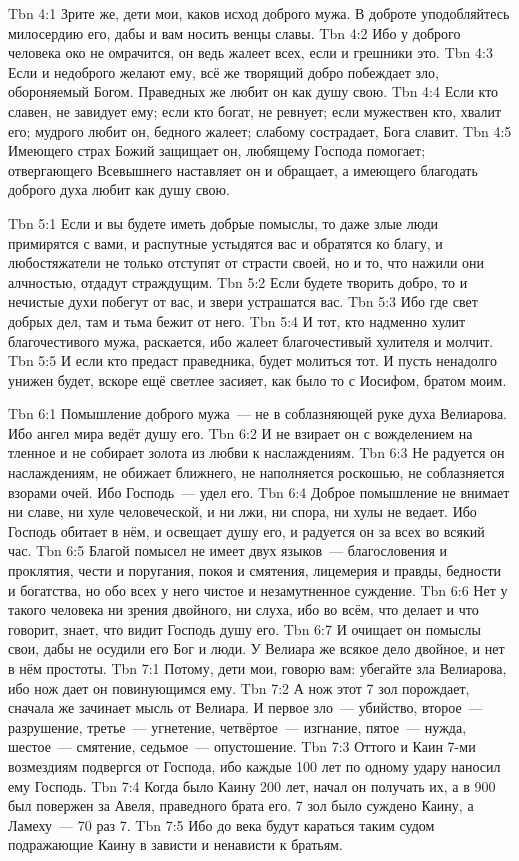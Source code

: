 \vs Tbn 4:1
Зрите же, дети мои, каков исход доброго мужа.
В доброте уподобляйтесь милосердию его, дабы и вам носить венцы славы.
\vs Tbn 4:2
Ибо у доброго человека око не омрачится, он ведь жалеет всех, если и
грешники это.
\vs Tbn 4:3
Если и недоброго желают ему, всё же творящий добро побеждает зло,
обороняемый Богом.
Праведных же любит он как душу свою.
\vs Tbn 4:4
Если кто славен, не завидует ему; если кто богат, не ревнует;
если мужествен кто, хвалит его; мудрого любит он, бедного жалеет;
слабому сострадает, Бога славит.
\vs Tbn 4:5
Имеющего страх Божий защищает он, любящему Господа помогает;
отвергающего Всевышнего наставляет он и обращает,
а имеющего благодать доброго духа любит как душу свою.

\vs Tbn 5:1
Если и вы будете иметь добрые помыслы,
то даже злые люди примирятся с вами,
и распутные устыдятся вас и обратятся ко благу,
и любостяжатели не только отступят от страсти своей,
но и то, что нажили они алчностью, отдадут страждущим.
\vs Tbn 5:2
Если будете творить добро, то и нечистые духи побегут от вас,
и звери устрашатся вас.
\vs Tbn 5:3
Ибо где свет добрых дел, там и тьма бежит от него.
\vs Tbn 5:4
И тот, кто надменно хулит благочестивого мужа, раскается,
ибо жалеет благочестивый хулителя и молчит.
\vs Tbn 5:5
И если кто предаст праведника, будет молиться тот.
И пусть ненадолго унижен будет, вскоре ещё светлее засияет,
как было то с Иосифом, братом моим.

\vs Tbn 6:1
Помышление доброго мужа~--- не в соблазняющей руке духа Велиарова.
Ибо ангел мира ведёт душу его.
\vs Tbn 6:2
И не взирает он с вожделением на тленное
и не собирает золота из любви к наслаждениям.
\vs Tbn 6:3
Не радуется он наслаждениям, не обижает ближнего,
не наполняется роскошью, не соблазняется взорами очей.
Ибо Господь~--- удел его.
\vs Tbn 6:4
Доброе помышление не внимает ни славе, ни хуле человеческой,
и ни лжи, ни спора, ни хулы не ведает.
Ибо Господь обитает в нём, и освещает душу его,
и радуется он за всех во всякий час.
\vs Tbn 6:5
Благой помысел не имеет двух языков~--- благословения и проклятия,
чести и поругания, покоя и смятения, лицемерия и правды,
бедности и богатства, но обо всех у него чистое и незамутненное суждение.
\vs Tbn 6:6
Нет у такого человека ни зрения двойного, ни слуха, ибо во всём,
что делает и что говорит, знает, что видит Господь душу его.
\vs Tbn 6:7
И очищает он помыслы свои, дабы не осудили его Бог и люди.
У Велиара же всякое дело двойное, и нет в нём простоты.
\vs Tbn 7:1
Потому, дети мои, говорю вам:
убегайте зла Велиарова, ибо нож дает он повинующимся ему.
\vs Tbn 7:2
А нож этот 7 зол порождает, сначала же зачинает мысль от Велиара.
И первое зло~--- убийство,
второе~--- разрушение,
третье~--- угнетение,
четвёртое~--- изгнание,
пятое~--- нужда,
шестое~--- смятение,
седьмое~--- опустошение.
\vs Tbn 7:3
Оттого и Каин 7-ми возмездиям подвергся от Господа,
ибо каждые 100 лет по одному удару наносил ему Господь.
\vs Tbn 7:4
Когда было Каину 200 лет, начал он получать их,
а в 900 был повержен за Авеля, праведного брата его.
7 зол было суждено Каину, а Ламеху~--- 70 раз 7.
\vs Tbn 7:5
Ибо до века будут караться таким судом подражающие Каину
в зависти и ненависти к братьям.
 
